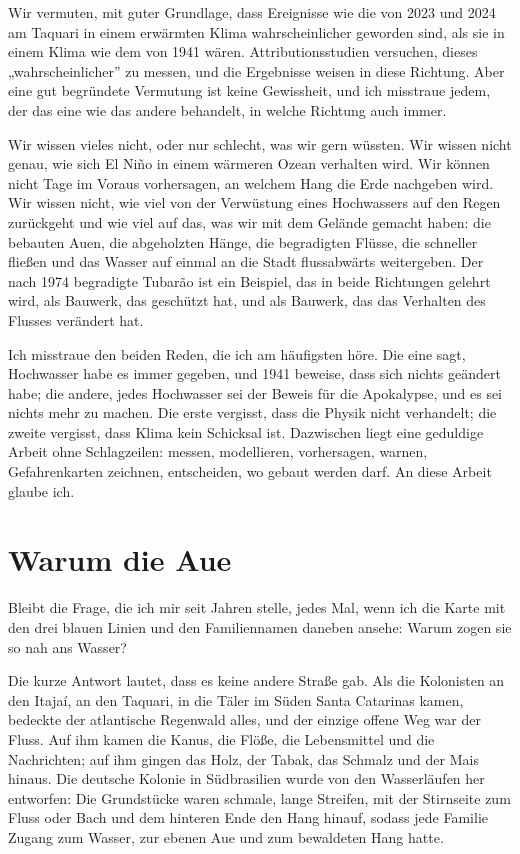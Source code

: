 \documentclass[
  ngerman,
  11pt,
  openany]{book}
\begin{document}
Wir vermuten, mit guter Grundlage, dass Ereignisse wie die von 2023 und
2024 am Taquari in einem erwärmten Klima wahrscheinlicher geworden sind,
als sie in einem Klima wie dem von 1941 wären. Attributionsstudien
versuchen, dieses „wahrscheinlicher'' zu messen, und die Ergebnisse
weisen in diese Richtung. Aber eine gut begründete Vermutung ist keine
Gewissheit, und ich misstraue jedem, der das eine wie das andere
behandelt, in welche Richtung auch immer.

Wir wissen vieles nicht, oder nur schlecht, was wir gern wüssten. Wir
wissen nicht genau, wie sich El Niño in einem wärmeren Ozean verhalten
wird. Wir können nicht Tage im Voraus vorhersagen, an welchem Hang die
Erde nachgeben wird. Wir wissen nicht, wie viel von der Verwüstung eines
Hochwassers auf den Regen zurückgeht und wie viel auf das, was wir mit
dem Gelände gemacht haben: die bebauten Auen, die abgeholzten Hänge, die
begradigten Flüsse, die schneller fließen und das Wasser auf einmal an
die Stadt flussabwärts weitergeben. Der nach 1974 begradigte Tubarão ist
ein Beispiel, das in beide Richtungen gelehrt wird, als Bauwerk, das
geschützt hat, und als Bauwerk, das das Verhalten des Flusses verändert
hat.

Ich misstraue den beiden Reden, die ich am häufigsten höre. Die eine
sagt, Hochwasser habe es immer gegeben, und 1941 beweise, dass sich
nichts geändert habe; die andere, jedes Hochwasser sei der Beweis für
die Apokalypse, und es sei nichts mehr zu machen. Die erste vergisst,
dass die Physik nicht verhandelt; die zweite vergisst, dass Klima kein
Schicksal ist. Dazwischen liegt eine geduldige Arbeit ohne Schlagzeilen:
messen, modellieren, vorhersagen, warnen, Gefahrenkarten zeichnen,
entscheiden, wo gebaut werden darf. An diese Arbeit glaube ich.

\section{Warum die Aue}\label{warum-die-aue}

Bleibt die Frage, die ich mir seit Jahren stelle, jedes Mal, wenn ich
die Karte mit den drei blauen Linien und den Familiennamen daneben
ansehe: Warum zogen sie so nah ans Wasser?

Die kurze Antwort lautet, dass es keine andere Straße gab. Als die
Kolonisten an den Itajaí, an den Taquari, in die Täler im Süden Santa
Catarinas kamen, bedeckte der atlantische Regenwald alles, und der
einzige offene Weg war der Fluss. Auf ihm kamen die Kanus, die Flöße,
die Lebensmittel und die Nachrichten; auf ihm gingen das Holz, der
Tabak, das Schmalz und der Mais hinaus. Die deutsche Kolonie in
Südbrasilien wurde von den Wasserläufen her entworfen: Die Grundstücke
waren schmale, lange Streifen, mit der Stirnseite zum Fluss oder Bach
und dem hinteren Ende den Hang hinauf, sodass jede Familie Zugang zum
Wasser, zur ebenen Aue und zum bewaldeten Hang hatte.
\end{document}

